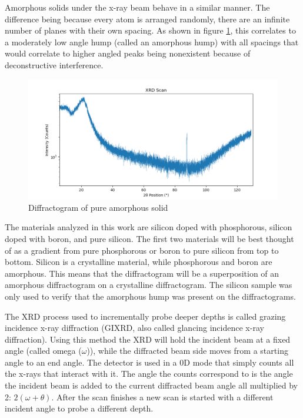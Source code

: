 \documentclass{article}
\begin{document}
\begin{multicols}{2}
    Amorphous solids under the x-ray beam behave in a similar manner. 
    The difference being because every atom is arranged randomly, there are an infinite number of planes with their own spacing. 
    As shown in figure \ref{fig:pure amorphous XRD scan}, this correlates to a moderately low angle hump (called an amorphous hump) with all spacings that would correlate to higher angled peaks being nonexistent because of deconstructive interference.

\begin{figure}[H]
    \centering
    \includegraphics[width=1\linewidth]{amorphous XRD scan.png}
    \caption{Diffractogram of pure amorphous solid}
    \label{fig:pure amorphous XRD scan}
\end{figure}

    The materials analyzed in this work are silicon doped with phosphorous, silicon doped with boron, and pure silicon. 
    The first two materials will be best thought of as a gradient from pure phosphorous or boron to pure silicon from top to bottom. 
    Silicon is a crystalline material, while phosphorous and boron are amorphous. 
    This means that the diffractogram will be a superposition of an amorphous diffractogram on a crystalline diffractogram. 
    The silicon sample was only used to verify that the amorphous hump was present on the diffractograms.

    The XRD process used to incrementally probe deeper depths is called grazing incidence x-ray diffraction (GIXRD, also called glancing incidence x-ray diffraction). 
    Using this method the XRD will hold the incident beam at a fixed angle (called omega ($\omega$)), while the diffracted beam side moves from a starting angle to an end angle. 
    The detector is used in a 0D mode that simply counts all the x-rays that interact with it. 
    The angle the counts correspond to is the angle the incident beam is added to the current diffracted beam angle all multiplied by 2: $2(\omega+\theta)$. 
    After the scan finishes a new scan is started with a different incident angle to probe a different depth.


\end{multicols}
\end{document}
